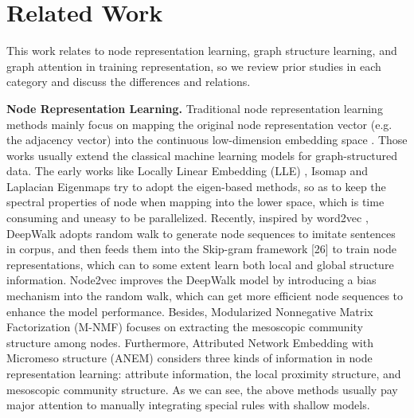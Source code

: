 \section{Related Work}
\label{sec:Literature}

This work relates to node representation learning, graph structure learning, and graph attention 
in training representation, so we review prior studies in each category and discuss the differences and relations.

\par\smallskip\noindent
\textbf{Node Representation Learning.}
Traditional node representation learning methods mainly focus on mapping the original node representation vector (e.g. the adjacency vector) into the continuous low-dimension embedding space \cite{goldberg2014word2vec}. 
%
Those works usually extend the classical machine learning models for graph-structured data. 
%
The early works like Locally Linear Embedding (LLE) \cite{roweis2000nonlinear}, Isomap \cite{tenenbaum2000global} and Laplacian Eigenmaps \cite{belkin2001laplacian} try to adopt the eigen-based methods, so as to keep the spectral properties of node when mapping into the lower space, which is time consuming and uneasy to be parallelized. 
%
Recently, inspired by word2vec \cite{mikolov2013distributed}, DeepWalk \cite{perozzi2014deepwalk} adopts random walk to generate node sequences to imitate sentences in corpus, and then feeds them into the Skip-gram framework [26] to train node representations, which can to some extent learn both local and global structure information.
%
Node2vec \cite{grover2016node2vec} improves the DeepWalk model by introducing a bias mechanism into the random walk, which can get more efficient node sequences to enhance the model performance. 
%
Besides, Modularized Nonnegative Matrix Factorization (M-NMF) \cite{wang2017community} focuses on extracting the mesoscopic community structure among nodes. 
%
Furthermore, Attributed Network Embedding with Micromeso structure (ANEM) \cite{li2021attributed} considers three kinds of information in node representation learning: attribute information, the local proximity structure, and mesoscopic community structure. 
%
As we can see, the above methods usually pay major attention to manually integrating special rules with shallow models.


